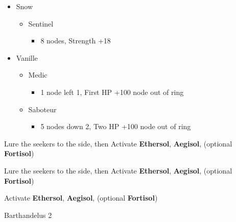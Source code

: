 \begin{paracol}{2}
\begin{menu}
\begin{itemize}
\begin{itemize}
\begin{itemize}
				      \end{itemize}
				\item Snow
				      \begin{itemize}
					      \item Sentinel
					            \begin{itemize}
						            \item 8 nodes, Strength +18
					            \end{itemize}
				      \end{itemize}
				\item Vanille
				      \begin{itemize}
					      \item Medic
					            \begin{itemize}
						            \item 1 node left 1, First HP +100 node out of ring
					            \end{itemize}
					      \item Saboteur
					            \begin{itemize}
						            \item 5 nodes down 2, Two HP +100 node out of ring
					            \end{itemize}
				      \end{itemize}
			\end{itemize}
		\end{itemize}
	\end{menu}
	\switchcolumn*
	Lure the seekers to the side, then 
	Activate \textbf{Ethersol}, \textbf{Aegisol}, (optional \textbf{Fortisol})
	\switchcolumn

	Lure the seekers to the side, then 
	Activate \textbf{Ethersol}, \textbf{Aegisol}, (optional \textbf{Fortisol})

	Activate \textbf{Ethersol}, \textbf{Aegisol}, (optional \textbf{Fortisol})
	\renewcommand{\first}{[1] Guerilla (\syn/\rav/\sab)}
	\renewcommand{\second}{[2] Tri-Disaster (\rav/\rav/\rav)}
	\renewcommand{\third}{[3] Thaumaturgy (\rav/\rav/\med)}
	\renewcommand{\fourth}{[4] Tireless Charge (\com/\com/\med)}
	\renewcommand{\fifth}{[5] Smart Bomb (\rav/\rav/\sab)}
	\renewcommand{\sixth}{[6] Aggression (\com/\com/\rav)}
	\switchcolumn*
	\begin{battle}{Barthandelus 2}


\end{battle}
\end{paracol}
